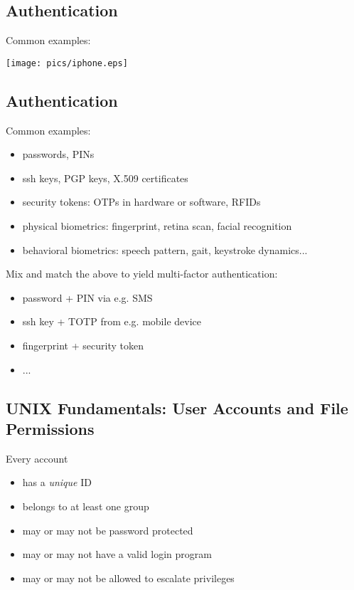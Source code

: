 \documentclass[xga]{xdvislides}
\begin{document}
\subsection{Authentication}
Common examples:
\vfill
\begin{center}
	\texttt{[image: pics/iphone.eps]}
\end{center}
\vfill

\subsection{Authentication}
Common examples:
\begin{itemize}
	\item passwords, PINs
	\item ssh keys, PGP keys, X.509 certificates
	\item security tokens: OTPs in hardware or software, RFIDs
	\item physical biometrics: fingerprint, retina scan, facial recognition
	\item behavioral biometrics: speech pattern, gait, keystroke dynamics...
\end{itemize}
\vspace{.5in}

Mix and match the above to yield multi-factor
authentication:
\begin{itemize}
	\item password + PIN via e.g. SMS
	\item ssh key + TOTP from e.g. mobile device
	\item fingerprint + security token
	\item ...
\end{itemize}


\subsection{UNIX Fundamentals: User Accounts and File Permissions}
Every account
\begin{itemize}
	\item has a {\em unique} ID
	\item belongs to at least one group
	\item may or may not be password protected
	\item may or may not have a valid login program
	\item may or may not be allowed to escalate privileges
\end{itemize}
\end{document}
